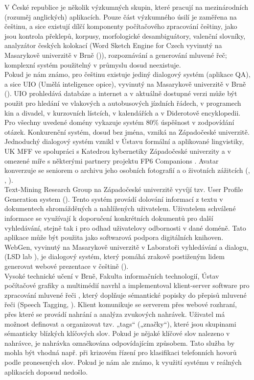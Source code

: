 \begin{multicols}{2}
V České republice je několik výzkumných skupin, které pracují na mezinárodních (rozuměj anglických) aplikacích. Pouze část výzkumného úsilí je zaměřena na češtinu, a sice existují dílčí komponenty počítačového zpracování češtiny, jako jsou kontrola překlepů, korpusy, morfologické desambiguátory, valenční slovníky, analyzátor českých kolokací (Word Sketch Engine for Czech vyvinutý na Masarykově univerzitě v Brně (\cite{Horak2009})), rozpoznávání a generování mluvené řeč; komplexní systém použitelný v průmyslu dosud neexistuje.\\
Pokud je nám známo, pro češtinu existuje jediný dialogový systém (aplikace QA), a sice UIO (Umělá inteligence opice), vyvinutý na Masarykově univerzitě v Brně (\cite{Svoboda2003}). UIO prohledává databáze a internet a v aktuálně dostupné verzi může být použit pro hledání ve vlakových a autobusových jízdních řádech, v programech kin a divadel, v kurzovních lístcích, v kalendářích a v Diderotově encyklopedii. Pro všechny uvedené domény vykazuje systém 80\% úspěšnost v zodpovídání otázek. Konkurenční systém, dosud bez jména, vzniká na Západočeské univerzitě.\\
Jednoduchý dialogový systém vznikl v Ústavu formální a aplikované lingvistiky, UK MFF ve spolupráci s Katedrou kybernetiky Západočeské univerzity a v omezené míře s některými partnery projektu FP6 Companions \cite{Note21}. Avatar konverzuje se seniorem o archivu jeho osobních fotografií a o životních zážitcích (\cite{Ptacek2010}, \cite{Romportl2010}, \cite{GruberTihelka2010}).\\
Text-Mining Research Group na Západočeské univerzitě vyvíjí tzv. User Profile Generation system (\cite{Grolmus2003}). Tento systém provádí dolování informací z textu v dokumentech shromážděných a nahlížených uživatelem. Uživatelem schválené informace se využívají k doporučení konkrétních dokumentů pro další vyhledávání, stejně tak i pro odhad uživatelovy odbornosti v dané doméně. Tato aplikace může být použita jako softwarová podpora digitálních knihoven.\\
WebGen, vyvinutý na Masarykově univerzitě v Laboratoři vyhledávání a dialogu, (LSD lab \cite{Note22}), je dialogový systém, který pomáhá zrakově postiženým lidem generovat webové prezentace v češtině (\cite{BartelPlhak2008}).\\
Vysoké technické učení v Brně, Fakulta informačních technologií, Ústav počítačové grafiky a multimédií navrhl a implementoval klient-server software pro zpracování mluvené řeči \cite{Note23}, který doplňuje sémantické popisky do přepisů mluvené řeči (Speech Tagging, \cite{Smrz2010}). Klient komunikuje se serverem přes webové rozhraní, přes které se provádí nahrání a analýza zvukových nahrávek. Uživatel má možnost definovat a organizovat tzv. „tags“ („značky“), které jsou skupinami sémanticky blízkých klíčových slov. Pokud je nějaké klíčové slov nalezeno v nahrávce, je nahrávka označkována odpovídajícím způsobem. Tato služba by mohla být vhodná např. při krizovém řízení pro klasifikaci telefonních hovorů podle pronesených slov. Pokud je nám ale známo, k využití systému v reálných aplikacích doposud nedošlo.\\

\end{multicols}
